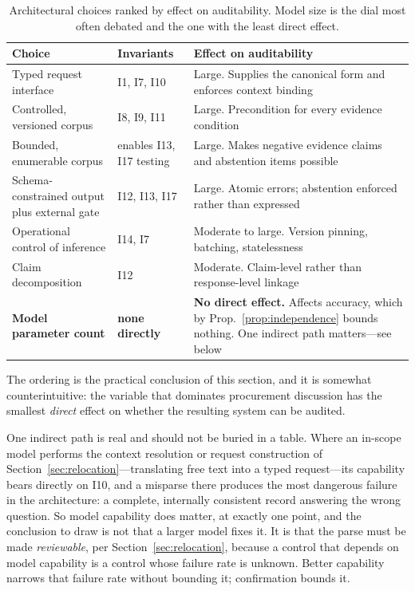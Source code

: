 \begin{table}[ht]
  \centering
  \small
  \begin{tabular}{@{}>{\raggedright\arraybackslash}p{4.0cm}>{\raggedright\arraybackslash}p{2.4cm}>{\raggedright\arraybackslash}p{6.4cm}@{}}
    \toprule
    Choice & Invariants & Effect on auditability \\
    \midrule
    Typed request interface
      & I1, I7, I10
      & Large. Supplies the canonical form and enforces context binding \\
    \addlinespace
    Controlled, versioned corpus
      & I8, I9, I11
      & Large. Precondition for every evidence condition \\
    \addlinespace
    Bounded, enumerable corpus
      & enables I13, I17 testing
      & Large. Makes negative evidence claims and abstention items possible \\
    \addlinespace
    Schema-constrained output plus external gate
      & I12, I13, I17
      & Large. Atomic errors; abstention enforced rather than expressed \\
    \addlinespace
    Operational control of inference
      & I14, I7
      & Moderate to large. Version pinning, batching, statelessness \\
    \addlinespace
    Claim decomposition
      & I12
      & Moderate. Claim-level rather than response-level linkage \\
    \addlinespace
    \textbf{Model parameter count}
      & \textbf{none directly}
      & \textbf{No direct effect.} Affects accuracy, which by
        Prop.~\ref{prop:independence} bounds nothing. One indirect path matters---see
        below \\
    \bottomrule
  \end{tabular}
  \caption{Architectural choices ranked by effect on auditability. Model size is the
    dial most often debated and the one with the least direct effect.}
  \label{tab:dials}
\end{table}

The ordering is the practical conclusion of this section, and it is somewhat
counterintuitive: the variable that dominates procurement discussion has the smallest
\emph{direct} effect on whether the resulting system can be audited.

One indirect path is real and should not be buried in a table. Where an in-scope model
performs the context resolution or request construction of
Section~\ref{sec:relocation}---translating free text into a typed request---its
capability bears directly on I10, and a misparse there produces the most dangerous
failure in the architecture: a complete, internally consistent record answering the
wrong question. So model capability does matter, at exactly one point, and the
conclusion to draw is not that a larger model fixes it. It is that the parse must be
made \emph{reviewable}, per Section~\ref{sec:relocation}, because a control that depends
on model capability is a control whose failure rate is unknown. Better capability
narrows that failure rate without bounding it; confirmation bounds it.

